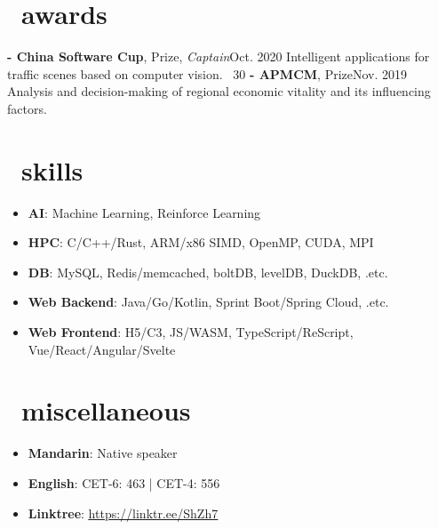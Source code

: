 \documentclass{common}
\begin{document}
\section{\faTrophy\ awards}
\award
    {\textbf{- China Software Cup},  Prize, \textit{Captain}}{Oct. 2020}
    {Intelligent applications for traffic scenes based on computer vision. 
        {\href{https://github.com/Sh-Zh-7/intelligent-transportation-system}{\underline{\faGithub}} \faStarO\ 30}
    }
\award
    {\textbf{- APMCM},  Prize}{Nov. 2019}
    {Analysis and decision-making of regional economic vitality and its influencing factors.}

\section{\faCogs\ skills}
\begin{itemize}[parsep=0.5ex]
    \item \textbf{AI}: Machine Learning, Reinforce Learning
    \item \textbf{HPC}: C/C++/Rust, ARM/x86 SIMD, OpenMP, CUDA, MPI
    \item \textbf{DB}: MySQL, Redis/memcached, boltDB, levelDB, DuckDB, .etc.
    \item \textbf{Web Backend}: Java/Go/Kotlin, Sprint Boot/Spring Cloud, .etc.
    \item \textbf{Web Frontend}: H5/C3, JS/WASM, TypeScript/ReScript, Vue/React/Angular/Svelte
\end{itemize}

\section{\faInfo\ miscellaneous}
\begin{itemize}[parsep=0.5ex]
    \item \textbf{Mandarin}: Native speaker
    \item \textbf{English}: CET-6: 463 | CET-4: 556
    \item \textbf{Linktree}: \href{https://linktr.ee/ShZh7}{\underline{https://linktr.ee/ShZh7}}
\end{itemize}
\end{document}
